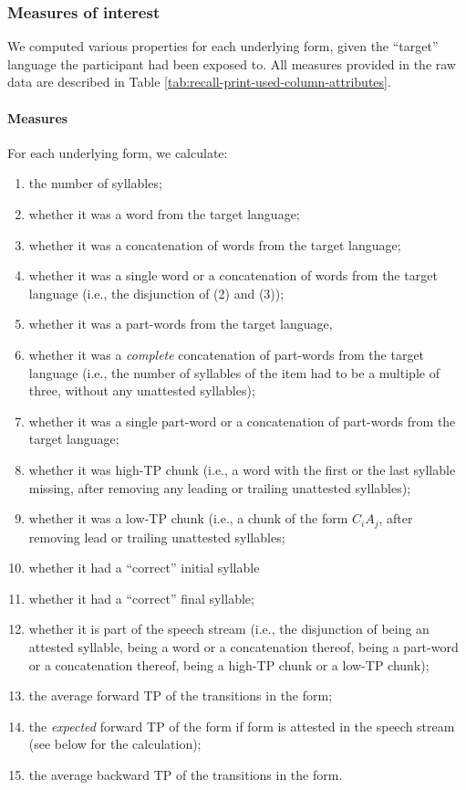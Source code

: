 \documentclass[
]{article}
\providecommand{\tightlist}{%
  \setlength{\itemsep}{0pt}\setlength{\parskip}{0pt}}
\begin{document}
\hypertarget{measures-of-interest}{%
\subsubsection{Measures of interest}\label{measures-of-interest}}

We computed various properties for each underlying form, given the
``target'' language the participant had been exposed to. All measures
provided in the raw data are described in Table
\ref{tab:recall-print-used-column-attributes}.

\hypertarget{measures}{%
\paragraph{Measures}\label{measures}}

For each underlying form, we calculate:

\begin{enumerate}
\def\labelenumi{\arabic{enumi}.}
\tightlist
\item
  the number of syllables;
\item
  whether it was a word from the target language;
\item
  whether it was a concatenation of words from the target language;
\item
  whether it was a single word or a concatenation of words from the
  target language (i.e., the disjunction of (2) and (3));
\item
  whether it was a part-words from the target language,
\item
  whether it was a \emph{complete} concatenation of part-words from the
  target language (i.e., the number of syllables of the item had to be a
  multiple of three, without any unattested syllables);
\item
  whether it was a single part-word or a concatenation of part-words
  from the target language;
\item
  whether it was high-TP chunk (i.e., a word with the first or the last
  syllable missing, after removing any leading or trailing unattested
  syllables);
\item
  whether it was a low-TP chunk (i.e., a chunk of the form \(C_iA_j\),
  after removing lead or trailing unattested syllables;
\item
  whether it had a ``correct'' initial syllable
\item
  whether it had a ``correct'' final syllable;
\item
  whether it is part of the speech stream (i.e., the disjunction of
  being an attested syllable, being a word or a concatenation thereof,
  being a part-word or a concatenation thereof, being a high-TP chunk or
  a low-TP chunk);
\item
  the average forward TP of the transitions in the form;
\item
  the \emph{expected} forward TP of the form if form is attested in the
  speech stream (see below for the calculation);
\item
  the average backward TP of the transitions in the form.
\end{enumerate}
\end{document}
